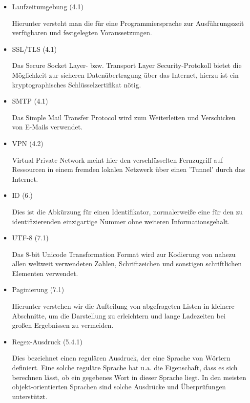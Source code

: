 \documentclass{article}
\begin{document}
\begin{itemize}
\begin{flushleft}
\end{flushleft}
\item Laufzeitumgebung (4.1)
\begin{flushleft}
Hierunter versteht man die für eine Programmiersprache zur Ausführungszeit verfügbaren und festgelegten Voraussetzungen.
\end{flushleft}
\item SSL/TLS (4.1)
\begin{flushleft}
Das Secure Socket Layer- bzw. Transport Layer Security-Protokoll bietet die Möglichkeit zur sicheren Datenübertragung über das Internet, hierzu ist ein kryptographisches Schlüsselzertifikat nötig.
\end{flushleft}
\item SMTP (4.1)
\begin{flushleft}
Das Simple Mail Transfer Protocol wird zum Weiterleiten und Verschicken von E-Mails verwendet.
\end{flushleft}
\item VPN (4.2)
\begin{flushleft}
Virtual Private Network meint hier den verschlüsselten Fernzugriff auf Ressourcen in einem fremden lokalen Netzwerk über einen 'Tunnel' durch das Internet.
\end{flushleft}
\item ID (6.)
\begin{flushleft}
Dies ist die Abkürzung für einen Identifikator, normalerweiße eine für den zu identifizierenden einzigartige Nummer ohne weiteren Informationsgehalt.
\end{flushleft}
\item UTF-8 (7.1)
\begin{flushleft}
Das 8-bit Unicode Transformation Format wird zur Kodierung von nahezu allen weltweit verwendeten Zahlen, Schriftzeichen und sonstigen schriftlichen Elementen verwendet.
\end{flushleft}
\item Paginierung (7.1)
\begin{flushleft}
Hierunter verstehen wir die Aufteilung von abgefrageten Listen in kleinere Abschnitte, um die Darstellung zu erleichtern und lange Ladezeiten bei großen Ergebnissen zu vermeiden.
\end{flushleft}
\item Regex-Ausdruck (5.4.1)
\begin{flushleft}
Dies bezeichnet einen regulären Ausdruck, der eine Sprache von Wörtern definiert. Eine solche reguläre Sprache hat u.a. die Eigenschaft, dass es sich berechnen lässt, ob ein gegebenes Wort in dieser Sprache liegt.
In den meisten objekt-orientierten Sprachen sind solche Ausdrücke und Überprüfungen unterstützt.
\end{flushleft}
\end{itemize}
\end{document}
